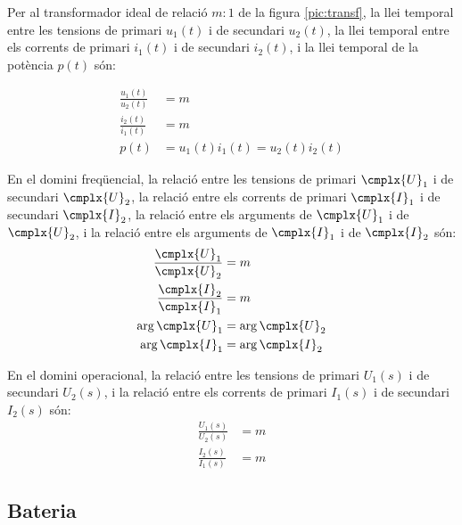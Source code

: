Per al transformador
ideal de relació $m\!:\!1$ de la figura \vref{pic:transf}, la llei temporal
entre les tensions de primari $u_1(t)$ i de secundari $u_2(t)$, la
llei temporal entre els corrents de primari $i_1(t)$ i de secundari
$i_2(t)$, i la llei temporal de la potència $p(t)$ són:

\hfill
\begin{minipage}[b]{6.5cm}
	
	\label{pic:transf}
\end{minipage}
\hfill
\begin{minipage}[b][3.8cm][t]{10cm}
	\begin{align}
		\frac{u_1(t)}{u_2(t)} &= m  \\
		\frac{i_2(t)}{i_1(t)} &= m \\
		p(t) &= u_1(t) i_1(t) = u_2(t) i_2(t)
	\end{align}
\end{minipage}


 En el domini
freqüencial, la relació entre les tensions de primari $\cmplx{U}_1$
i de secundari $\cmplx{U}_2$, la relació entre els corrents de
primari $\cmplx{I}_1$ i de secundari $\cmplx{I}_2$, la relació entre
els arguments de $\cmplx{U}_1$ i de $\cmplx{U}_2$, i  la relació entre els arguments de $\cmplx{I}_1$ i de $\cmplx{I}_2$  són:
\begin{align}
	\frac{\cmplx{U}_1}{\cmplx{U}_2} &= m  \\
	\frac{\cmplx{I}_2}{\cmplx{I}_1} &= m \\
	\arg{\cmplx{U}_1} &= \arg{\cmplx{U}_2} \\
	\arg{\cmplx{I}_1} &= \arg{\cmplx{I}_2}
\end{align}

 En el domini operacional, la relació entre les tensions de primari $U_1(s)$ i de secundari $U_2(s)$,  i la relació entre els corrents de primari $I_1(s)$ i de secundari $I_2(s)$ són:
\begin{align}
	\frac{U_1(s)}{U_2(s)} &= m  \\
	\frac{I_2(s)}{I_1(s)} &= m
\end{align}

\subsection{Bateria} 

